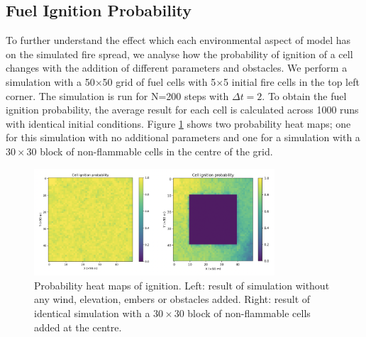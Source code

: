 \subsection{Fuel Ignition Probability}\label{4.5}

To further understand the effect which each environmental aspect of model has on the simulated fire spread, we analyse how the probability of ignition of a cell changes with the addition of different parameters and obstacles. We perform a simulation with a 50$\times$50 grid of fuel cells with 5$\times$5 initial fire cells in the top left corner. The simulation is run for N=200 steps with $\Delta t=2$. To obtain the fuel ignition probability, the average result for each cell is calculated across 1000 runs with identical initial conditions. Figure \ref{f47} shows two probability heat maps; one for this simulation with no additional parameters and one for a simulation with a $30\times30$ block of non-flammable cells in the centre of the grid.

\begin{figure}[h!]
\begin{center}
\includegraphics[width=0.8\textwidth]{Figures/h.png}
\caption{Probability heat maps of ignition. Left: result of simulation without any wind, elevation, embers or obstacles added. Right: result of identical simulation with a $30\times30$ block of non-flammable cells added at the centre.}\label{f47} \end{center}
\end{figure} 

